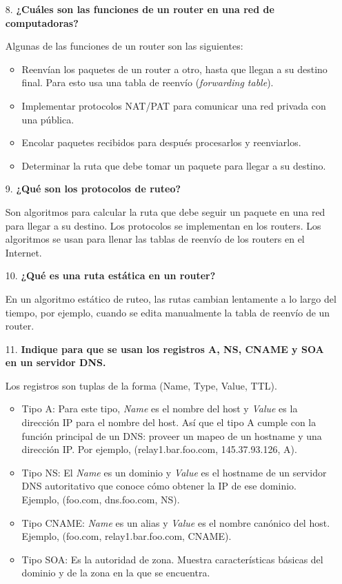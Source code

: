 \documentclass{article}
\begin{document}
\begin{itemize}
\item[8.] \textbf{¿Cuáles son las funciones de un router en una red de computadoras?}

Algunas de las funciones de un router son las siguientes:

\begin{itemize}
\item Reenvían los paquetes de un router a otro, hasta que llegan a su destino final. Para esto usa una tabla de reenvío (\textit{forwarding table}).
\item Implementar protocolos NAT/PAT para comunicar una red privada con una pública.
\item Encolar paquetes recibidos para después procesarlos y reenviarlos.
\item Determinar la ruta que debe tomar un paquete para llegar a su destino.
\end{itemize}

\item[9.] \textbf{¿Qué son los protocolos de ruteo?}

Son algoritmos para calcular la ruta que debe seguir un paquete en una red para llegar a su destino. Los protocolos se implementan en los routers. Los algoritmos se usan para llenar las tablas de reenvío de los routers en el Internet.

\item[10.] \textbf{¿Qué es una ruta estática en un router?}

En un algoritmo estático de ruteo, las rutas cambian lentamente a lo largo del tiempo, por ejemplo, cuando se edita manualmente la tabla de reenvío de un router.

\item[11.] \textbf{Indique para que se usan los registros A, NS, CNAME y SOA en un servidor DNS.}

Los registros son tuplas de la forma (Name, Type, Value, TTL).

\begin{itemize}
\item Tipo A: Para este tipo, \textit{Name} es el nombre del host y \textit{Value} es la dirección IP para el nombre del host. Así que el tipo A cumple con la función principal de un DNS: proveer un mapeo de un hostname y una dirección IP. Por ejemplo, (relay1.bar.foo.com, 145.37.93.126, A).

\item Tipo NS: El \textit{Name} es un dominio y \textit{Value} es el hostname de un servidor DNS autoritativo que conoce cómo obtener la IP de ese dominio. Ejemplo, (foo.com, dns.foo.com, NS).

\item Tipo CNAME: \textit{Name} es un alias y \textit{Value} es el nombre canónico del host. Ejemplo, (foo.com, relay1.bar.foo.com, CNAME).

\item Tipo SOA: Es la autoridad de zona. Muestra características básicas del dominio y de la zona en la que se encuentra.
\end{itemize}

\end{itemize}
\end{document}
